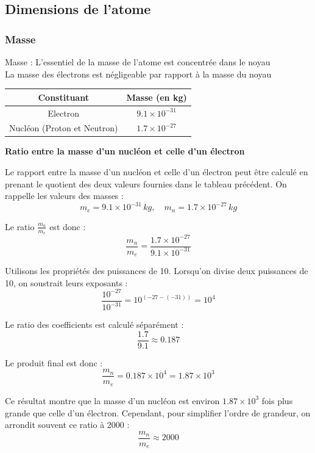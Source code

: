 \documentclass[a4paper,12pt]{article}
\begin{document}
\subsection{Dimensions de l'atome}

\subsubsection{Masse}

Masse : L'essentiel de la masse de l'atome est concentrée dans le noyau \\ 
La masse des électrons est négligeable par rapport à la masse du noyau

\vspace{1em}
\begin{tabular}{SS}
  \toprule
  {Constituant} & {Masse (en \si{kg})} \\
  \midrule
  {Electron} & {\(9.1 \times 10^{-31}\)} \\
  {Nucléon (Proton et Neutron)} & {\(1.7 \times 10^{-27}\)} \\
  \bottomrule
\end{tabular}

\vspace{1em}
\textbf{Ratio entre la masse d'un nucléon et celle d'un électron} \par 
\vspace{1em}
Le rapport entre la masse d'un nucléon et celle d'un électron peut être calculé en prenant le quotient des deux valeurs fournies dans le tableau précédent. On rappelle les valeurs des masses :
\[
m_e = 9.1 \times 10^{-31} \, \si{kg}, \quad m_n = 1.7 \times 10^{-27} \, \si{kg}
\]

Le ratio \(\frac{m_n}{m_e}\) est donc :
\[
\frac{m_n}{m_e} = \frac{1.7 \times 10^{-27}}{9.1 \times 10^{-31}}
\]

Utilisons les propriétés des puissances de 10. Lorsqu'on divise deux puissances de 10, on soustrait leurs exposants :
\[
\frac{10^{-27}}{10^{-31}} = 10^{(-27 - (-31))} = 10^{4}
\]

Le ratio des coefficients est calculé séparément :
\[
\frac{1.7}{9.1} \approx 0.187
\]

Le produit final est donc :
\[
\frac{m_n}{m_e} = 0.187 \times 10^4 = 1.87 \times 10^3
\]

Ce résultat montre que la masse d'un nucléon est environ \(1.87 \times 10^3\) fois plus grande que celle d'un électron. Cependant, pour simplifier l'ordre de grandeur, on arrondit souvent ce ratio à 2000 :
\[
\frac{m_n}{m_e} \approx 2000
\]
\end{document}
